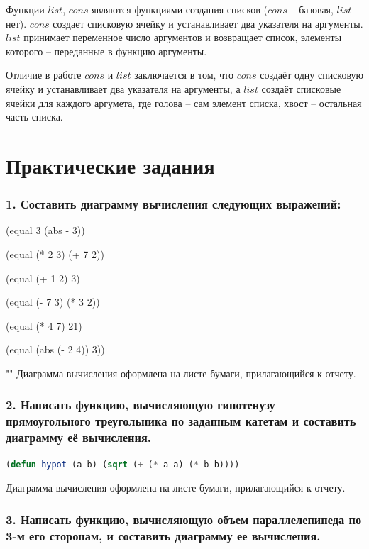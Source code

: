 \documentclass[12pt]{report}
\begin{document}
Функции $list$, $cons$ являются функциями создания списков ($cons$ – базовая, $list$ – нет). $cons$ создает списковую ячейку и устанавливает два указателя на аргументы. $list$ принимает переменное число аргументов и возвращает список, элементы которого – переданные в функцию аргументы.

Отличие в работе $cons$ и $list$ заключается в том, что $cons$ создаёт одну списковую ячейку и устанавливает два указателя на аргументы, а $list$ создаёт списковые ячейки для каждого аргумета, где голова -- сам элемент списка, хвост -- остальная часть списка.

\chapter*{Практические задания}

\subsection*{1. Составить диаграмму вычисления следующих выражений:}

(equal 3 (abs - 3))  

(equal (* 2 3) (+ 7 2))

(equal (+ 1 2) 3) 

(equal (- 7 3) (* 3 2))

(equal (* 4 7) 21) 

(equal (abs (- 2 4)) 3))

""\newline
Диаграмма вычисления оформлена на листе бумаги, прилагающийся к отчету.

\subsection*{2. Написать функцию, вычисляющую гипотенузу прямоугольного треугольника по заданным катетам и составить диаграмму её вычисления.}

\begin{lstlisting}[label=6xd, caption=Решение задания №2, language=lisp]
	(defun hypot (a b) (sqrt (+ (* a a) (* b b))))
\end{lstlisting}
	
Диаграмма вычисления оформлена на листе бумаги, прилагающийся к отчету.

\subsection*{3. Написать функцию, вычисляющую объем параллелепипеда по 3-м его сторонам, и составить диаграмму ее вычисления.}
\end{document}
